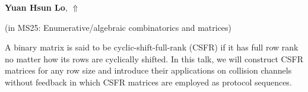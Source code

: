 \documentclass[ILAS2025-program.tex]{subfiles}
\begin{document}
\hypertarget{down0367}{}\begin{ilasabstract}
    
\textbf{Yuan Hsun Lo},  \hfill \hyperlink{up0367}{$\Uparrow$}
    
    
(in {\color{mstitle}MS25: Enumerative/algebraic combinatorics and matrices})
        
\mtskip
    A binary matrix is said to be cyclic-shift-full-rank (CSFR) if it has full row rank no matter how its rows are cyclically shifted.
In this talk, we will construct CSFR matrices for any row size and introduce their applications on collision channels without feedback in which CSFR matrices are employed as protocol sequences.

\end{ilasabstract}
    
\end{document}
